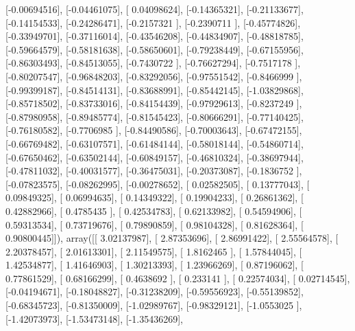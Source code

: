 \documentclass{article}
\begin{document}
       [-0.00694516],
       [-0.04461075],
       [ 0.04098624],
       [-0.14365321],
       [-0.21133677],
       [-0.14154533],
       [-0.24286471],
       [-0.2157321 ],
       [-0.2390711 ],
       [-0.45774826],
       [-0.33949701],
       [-0.37116014],
       [-0.43546208],
       [-0.44834907],
       [-0.48818785],
       [-0.59664579],
       [-0.58181638],
       [-0.58650601],
       [-0.79238449],
       [-0.67155956],
       [-0.86303493],
       [-0.84513055],
       [-0.7430722 ],
       [-0.76627294],
       [-0.7517178 ],
       [-0.80207547],
       [-0.96848203],
       [-0.83292056],
       [-0.97551542],
       [-0.8466999 ],
       [-0.99399187],
       [-0.84514131],
       [-0.83688991],
       [-0.85442145],
       [-1.03829868],
       [-0.85718502],
       [-0.83733016],
       [-0.84154439],
       [-0.97929613],
       [-0.8237249 ],
       [-0.87980958],
       [-0.89485774],
       [-0.81545423],
       [-0.80666291],
       [-0.77140425],
       [-0.76180582],
       [-0.7706985 ],
       [-0.84490586],
       [-0.70003643],
       [-0.67472155],
       [-0.66769482],
       [-0.63107571],
       [-0.61484144],
       [-0.58018144],
       [-0.54860714],
       [-0.67650462],
       [-0.63502144],
       [-0.60849157],
       [-0.46810324],
       [-0.38697944],
       [-0.47811032],
       [-0.40031577],
       [-0.36475031],
       [-0.20373087],
       [-0.1836752 ],
       [-0.07823575],
       [-0.08262995],
       [-0.00278652],
       [ 0.02582505],
       [ 0.13777043],
       [ 0.09849325],
       [ 0.06994635],
       [ 0.14349322],
       [ 0.19904233],
       [ 0.26861362],
       [ 0.42882966],
       [ 0.4785435 ],
       [ 0.42534783],
       [ 0.62133982],
       [ 0.54594906],
       [ 0.59313534],
       [ 0.73719676],
       [ 0.79890859],
       [ 0.98104328],
       [ 0.81628364],
       [ 0.90800445]]), array([[ 3.02137987],
       [ 2.87353696],
       [ 2.86991422],
       [ 2.55564578],
       [ 2.20378457],
       [ 2.01613301],
       [ 2.11549575],
       [ 1.8162465 ],
       [ 1.57844045],
       [ 1.42534877],
       [ 1.41646903],
       [ 1.30213393],
       [ 1.23966269],
       [ 0.87196062],
       [ 0.77861529],
       [ 0.68166299],
       [ 0.4638692 ],
       [ 0.233141  ],
       [ 0.22574034],
       [ 0.02714545],
       [-0.04194671],
       [-0.18048827],
       [-0.31238209],
       [-0.59556923],
       [-0.55139852],
       [-0.68345723],
       [-0.81350009],
       [-1.02989767],
       [-0.98329121],
       [-1.0553025 ],
       [-1.42073973],
       [-1.53473148],
       [-1.35436269],
\end{document}
